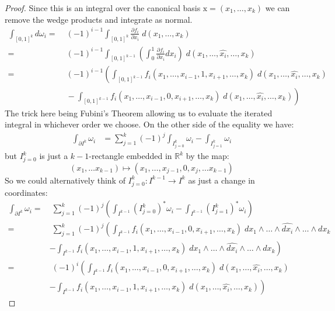\begin{proof}
Since this is an integral over the canonical basis $\text{x} = (x_1, \ldots, x_k)$ we can remove the wedge products and
integrate as normal.
\begin{align*}
	\int_{[0,1]^k} d\omega_i
		=&\; (-1)^{i-1} \int_{[0,1]^k} \frac{\partial f_i}{\partial x_i}\; d(x_1, \ldots, x_k) \\
		=&\; (-1)^{i-1} \int_{[0,1]^{k-1}} \left( \int_0^1 \frac{\partial f_i}{\partial x_i} dx_i \right) 
			\;d(x_1, \ldots, \widehat{x_i}, \ldots, x_k)\\
		=&\; (-1)^{i-1}\left( \int_{[0,1]^{k-1}} f_i(x_1, \ldots, x_{i-1}, 1, x_{i+1}, \ldots, x_k)
			\;d(x_1, \ldots, \widehat{x_i}, \ldots, x_k) \right.\\
		&\;	- \left. \int_{[0,1]^{k-1}} f_i(x_1, \ldots, x_{i-1}, 0, x_{i+1}, \ldots, x_k)
			\;d(x_1, \ldots, \widehat{x_i}, \ldots, x_k) \right)
\end{align*}
The trick here being Fubini's Theorem allowing us to evaluate the iterated integral in whichever order we choose.
On the other side of the equality we have:
\begin{align*}
	\int_{\partial I^k} \omega_i
		&= \sum_{j=1}^k (-1)^j \int_{I^k_{j=0}} \omega_i - \int_{I^k_{j=1}} \omega_i
\end{align*}
but $I^k_{j=0}$ is just a $k-1$-rectangle embedded in $\mathbb{R}^k$ by the map:
\begin{equation*}
	(x_1, \ldots x_{k-1}) \mapsto (x_1, \ldots, x_{j-1}, 0, x_{j}, \ldots x_{k-1})
\end{equation*}
So we could alternatively think of $I^k_{j=0}: I^{k-1} \to I^k$ as just a change in coordinates:
\begin{align*}
	\int_{\partial I^k} \omega_i 
		=&\; \sum_{j=1}^k (-1)^j 
			\left(\int_{I^{k-1}} (I^k_{j=0})^*\omega_i - \int_{I^{k-1}} (I^k_{j=1})^* \omega_i \right) \\
		=&\; \sum_{j=1}^k (-1)^j 
			\left(\int_{I^{k-1}} f_i (x_1, \ldots, x_{i-1}, 0, x_{i+1}, \ldots, x_k)
				\;dx_1 \wedge \ldots \wedge \widehat{dx_i} \wedge  \ldots \wedge dx_k \right. \\
		&	\left. - \int_{I^{k-1}} f_i (x_1, \ldots, x_{i-1}, 1, x_{i+1}, \ldots, x_k)
				\;dx_1 \wedge \ldots \wedge \widehat{dx_i} \wedge  \ldots \wedge dx_k \right)\\
		=&\; (-1)^i \left(\int_{I^{k-1}} f_i (x_1, \ldots, x_{i-1}, 0, x_{i+1}, \ldots, x_k)
				\;d(x_1, \ldots,\widehat{x_i},  \ldots, x_k) \right. \\
		&	\left. - \int_{I^{k-1}} f_i (x_1, \ldots, x_{i-1}, 1, x_{i+1}, \ldots, x_k)
				\;d(x_1, \ldots,\widehat{x_i},  \ldots, x_k) \right)
\end{align*}




\end{proof}
